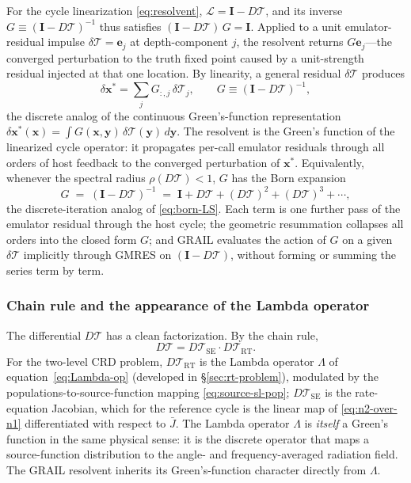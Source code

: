 \documentclass[11pt]{article}
\newcommand{\Lop}{\Lambda}
\newcommand{\Tcyc}{\mathcal{T}}
\newcommand{\Trt}{\Tcyc_{\mathrm{RT}}}
\newcommand{\Tse}{\Tcyc_{\mathrm{SE}}}
\newcommand{\Jbar}{\bar{J}}
\begin{document}
For the cycle linearization \eqref{eq:resolvent}, $\mathcal{L} =
\mathbf{I} - D\Tcyc$, and its inverse $G \equiv (\mathbf{I} -
D\Tcyc)^{-1}$ thus satisfies $(\mathbf{I} - D\Tcyc)\,G = \mathbf{I}$.
Applied to a unit emulator-residual impulse $\delta\mathcal{T} =
\mathbf{e}_j$ at depth-component $j$, the resolvent returns $G
\mathbf{e}_j$---the converged perturbation to the truth fixed point
caused by a unit-strength residual injected at that one location.  By
linearity, a general residual $\delta\mathcal{T}$ produces
\begin{equation}
\delta\mathbf{x}^*
= \sum_j G_{:,j}\,\delta\mathcal{T}_j,
\qquad G \equiv (\mathbf{I} - D\Tcyc)^{-1},
\label{eq:greens-superposition}
\end{equation}
the discrete analog of the continuous Green's-function representation
$\delta\mathbf{x}^*(\mathbf{x}) = \int G(\mathbf{x},\mathbf{y})\,
\delta\mathcal{T}(\mathbf{y})\,d\mathbf{y}$.  The resolvent is the
Green's function of the linearized cycle operator: it propagates
per-call emulator residuals through all orders of host feedback to the
converged perturbation of $\mathbf{x}^*$.  Equivalently, whenever the
spectral radius $\rho(D\Tcyc) < 1$, $G$ has the Born expansion
\begin{equation}
G \;=\; (\mathbf{I} - D\Tcyc)^{-1}
\;=\; \mathbf{I} + D\Tcyc + (D\Tcyc)^2 + (D\Tcyc)^3 + \cdots ,
\label{eq:born}
\end{equation}
the discrete-iteration analog of \eqref{eq:born-LS}.  Each term is one
further pass of the emulator residual through the host cycle; the
geometric resummation collapses all orders into the closed form $G$;
and GRAIL evaluates the action of $G$ on a given $\delta\mathcal{T}$
implicitly through GMRES on $(\mathbf{I} - D\Tcyc)$, without forming
or summing the series term by term.

\subsubsection{Chain rule and the appearance of the Lambda operator}
\label{sec:chain-rule}

The differential $D\Tcyc$ has a clean factorization.  By the chain rule,
\begin{equation}
D\Tcyc = D\Tse \cdot D\Trt.
\label{eq:cycle-chainrule}
\end{equation}
For the two-level CRD problem, $D\Trt$ is the Lambda operator $\Lop$
of equation~\eqref{eq:Lambda-op} (developed in
§\ref{sec:rt-problem}), modulated by the populations-to-source-function
mapping \eqref{eq:source-sl-pop}; $D\Tse$ is the rate-equation Jacobian,
which for the reference cycle is the linear map of \eqref{eq:n2-over-n1}
differentiated with respect to $\Jbar$.  The Lambda operator $\Lop$ is
\emph{itself} a Green's function in the same physical sense: it is
the discrete operator that maps a source-function distribution to the
angle- and frequency-averaged radiation field.  The GRAIL resolvent
inherits its Green's-function character directly from $\Lop$.
\end{document}
